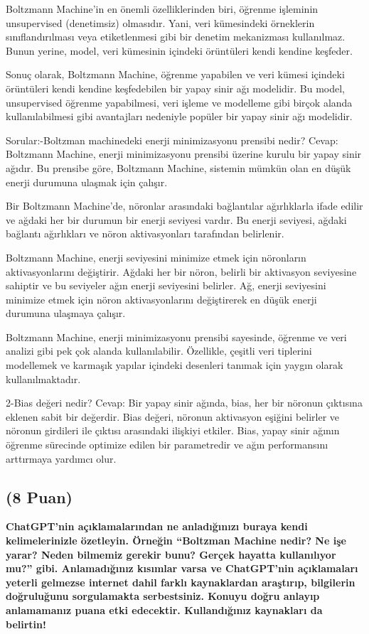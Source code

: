 \documentclass[11pt]{article}
\begin{document}
Boltzmann Machine'in en önemli özelliklerinden biri, öğrenme işleminin unsupervised (denetimsiz) olmasıdır. Yani, veri kümesindeki örneklerin sınıflandırılması veya etiketlenmesi gibi bir denetim mekanizması kullanılmaz. Bunun yerine, model, veri kümesinin içindeki örüntüleri kendi kendine keşfeder.

Sonuç olarak, Boltzmann Machine, öğrenme yapabilen ve veri kümesi içindeki örüntüleri kendi kendine keşfedebilen bir yapay sinir ağı modelidir. Bu model, unsupervised öğrenme yapabilmesi, veri işleme ve modelleme gibi birçok alanda kullanılabilmesi gibi avantajları nedeniyle popüler bir yapay sinir ağı modelidir.

Sorular:-Boltzman machinedeki enerji minimizasyonu prensibi nedir?\newline
Cevap: Boltzmann Machine, enerji minimizasyonu prensibi üzerine kurulu bir yapay sinir ağıdır. Bu prensibe göre, Boltzmann Machine, sistemin mümkün olan en düşük enerji durumuna ulaşmak için çalışır.

Bir Boltzmann Machine'de, nöronlar arasındaki bağlantılar ağırlıklarla ifade edilir ve ağdaki her bir durumun bir enerji seviyesi vardır. Bu enerji seviyesi, ağdaki bağlantı ağırlıkları ve nöron aktivasyonları tarafından belirlenir.

Boltzmann Machine, enerji seviyesini minimize etmek için nöronların aktivasyonlarını değiştirir. Ağdaki her bir nöron, belirli bir aktivasyon seviyesine sahiptir ve bu seviyeler ağın enerji seviyesini belirler. Ağ, enerji seviyesini minimize etmek için nöron aktivasyonlarını değiştirerek en düşük enerji durumuna ulaşmaya çalışır.

Boltzmann Machine, enerji minimizasyonu prensibi sayesinde, öğrenme ve veri analizi gibi pek çok alanda kullanılabilir. Özellikle, çeşitli veri tiplerini modellemek ve karmaşık yapılar içindeki desenleri tanımak için yaygın olarak kullanılmaktadır.

2-Bias değeri nedir?\newline
Cevap: Bir yapay sinir ağında, bias, her bir nöronun çıktısına eklenen sabit bir değerdir. Bias değeri, nöronun aktivasyon eşiğini belirler ve nöronun girdileri ile çıktısı arasındaki ilişkiyi etkiler. Bias, yapay sinir ağının öğrenme sürecinde optimize edilen bir parametredir ve ağın performansını arttırmaya yardımcı olur.

\subsection{(8 Puan)} \textbf{ChatGPT’nin açıklamalarından ne anladığınızı buraya kendi kelimelerinizle özetleyin. Örneğin ``Boltzman Machine nedir? Ne işe yarar? Neden bilmemiz gerekir bunu? Gerçek hayatta kullanılıyor mu?'' gibi. Anlamadığınız kısımlar varsa ve ChatGPT’nin açıklamaları yeterli gelmezse internet dahil farklı kaynaklardan araştırıp, bilgilerin doğruluğunu sorgulamakta serbestsiniz. Konuyu doğru anlayıp anlamamanız puana etki edecektir. Kullandığınız kaynakları da belirtin!}
\end{document}
